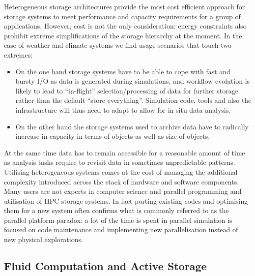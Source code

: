 \documentclass{../../template/esiwace-report}
\begin{document}
Heterogeneous storage architectures provide the most cost efficient approach for storage systems to meet performance and capacity requirements for a group of applications. However, cost is not the only consideration: 
energy constraints also prohibit extreme simplifications of the storage hierarchy at the moment.
In the case of weather and climate systems we find usage scenarios that touch two extremes:
\begin{itemize}
\item
On the one hand storage systems have to be able to cope with fast and bursty I/O as data is generated during simulations, and workflow evolution is likely to lead to ``in-flight'' selection/processing of data for further storage rather than the default ``store everything''. Simulation code, tools and also the infrastructure will thus need to adapt to allow for in situ data analysis.
\item 
On the other hand the storage systems used to archive data have to radically increase in capacity in terms of objects as well as size of objects.
\end{itemize}
At the same time data has to remain accessible for a reasonable amount of time as analysis tasks require to revisit data in sometimes unpredictable patterns. Utilising heterogeneous systems comes at the cost of managing the additional complexity introduced across the stack of hardware and software components.
Many users are not experts in computer science and parallel programming and utilisation of HPC storage systems.
In fact porting existing codes and optimising them for a new system often confirms what is commonly referred to as the parallel platform paradox: a lot of the time is spent in parallel simulation is focused on code maintenance and implementing new parallelisation instead of new physical explorations.

\subsection{Fluid Computation and Active Storage}
\end{document}
